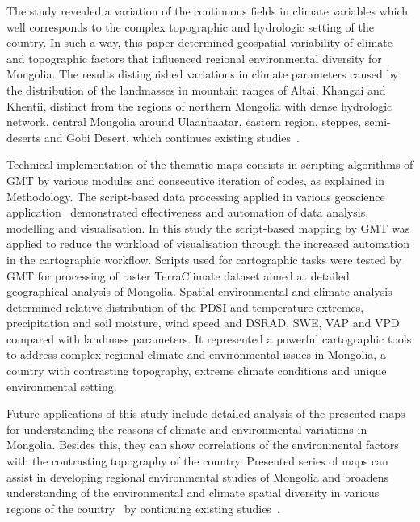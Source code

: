 \documentclass[geosciences,article,accept,pdftex,oneauthor]{Definitions/mdpi}
\begin{document}
The study revealed a variation of the continuous fields in climate variables which well corresponds to the complex topographic and hydrologic setting of the country. In such a way, this paper determined geospatial variability of climate and topographic factors that influenced regional environmental diversity for Mongolia. The results distinguished variations in climate parameters caused by the distribution of the landmasses in mountain ranges of Altai, Khangai and Khentii, distinct from the regions of northern Mongolia with dense hydrologic network, central Mongolia around Ulaanbaatar, eastern region, steppes, semi-deserts and Gobi Desert, which continues existing studies~\cite{Cook,Ulaankhuu}. 

Technical implementation of the thematic maps consists in scripting algorithms of GMT by various modules and consecutive iteration of codes, as explained in Methodology. The script-based data processing applied in various geoscience application~\cite{Lemenkova2019c,Lemenkov2021} demonstrated effectiveness and automation of data analysis, modelling and visualisation. In this study the script-based mapping by GMT was applied to reduce the workload of visualisation through the increased automation in the cartographic workflow. Scripts used for cartographic tasks were tested by GMT for processing of raster TerraClimate dataset aimed at detailed geographical analysis of Mongolia. Spatial environmental and climate analysis determined relative distribution of the PDSI and temperature extremes, precipitation and soil moisture, wind speed and DSRAD, SWE, VAP and VPD compared with landmass parameters. It represented a powerful cartographic tools to address complex regional climate and environmental issues in Mongolia, a country with contrasting topography, extreme climate conditions and unique environmental setting. 

Future applications of this study include detailed analysis of the presented maps for understanding the reasons of climate and environmental variations in Mongolia. Besides this, they can show correlations of the environmental factors with the contrasting topography of the country. Presented series of maps can assist in developing regional environmental studies of Mongolia and broadens understanding of the environmental and climate spatial diversity in various regions of the country~\cite{MAS,Pfeiffer} by continuing existing studies~\cite{Altanbold,Jamyansuren,Jugder}. 

\end{document}
